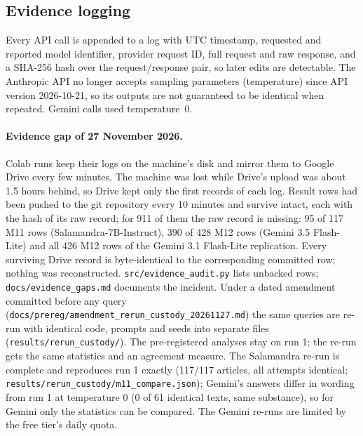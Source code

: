 \documentclass[10pt,a4paper]{article}
\begin{document}
\subsection{Evidence logging}
Every API call is appended to a log with UTC timestamp, requested and reported model identifier, provider request ID,
full request and raw response, and a SHA-256 hash over the request/response pair, so later edits are detectable. The
Anthropic API no longer accepts sampling parameters (temperature) since API version 2026-10-21, so its outputs are not
guaranteed to be identical when repeated. Gemini calls used temperature~0.

\paragraph{Evidence gap of 27 November 2026.} Colab runs keep their logs on the machine's disk and mirror them to
Google Drive every few minutes. The machine was lost while Drive's upload was about 1.5 hours behind, so Drive kept only
the first records of each log. Result rows had been pushed to the git repository every 10 minutes and survive intact,
each with the hash of its raw record; for 911 of them the raw record is missing: 95 of 117 M11 rows
(Salamandra-7B-Instruct), 390 of 428 M12 rows (Gemini 3.5 Flash-Lite) and all 426 M12 rows of the Gemini 3.1
Flash-Lite replication. Every surviving Drive record is byte-identical to the corresponding committed row; nothing was
reconstructed. \texttt{src/evidence\_audit.py} lists unbacked rows; \texttt{docs/evidence\_gaps.md} documents the
incident. Under a dated amendment committed before any query
(\texttt{docs/prereg/amendment\_rerun\_custody\_20261127.md}) the same queries are re-run with identical code,
prompts and seeds into separate files (\texttt{results/rerun\_custody/}). The pre-registered analyses stay on run 1;
the re-run gets the same statistics and an agreement measure. The Salamandra re-run is complete and reproduces run 1
exactly (117/117 articles, all attempts identical; \texttt{results/rerun\_custody/m11\_compare.json}); Gemini's answers differ in wording from run 1 at temperature 0 (0 of 61 identical
texts, same substance), so for Gemini only the statistics can be compared. The Gemini re-runs are limited by the
free tier's daily quota.
\end{document}
